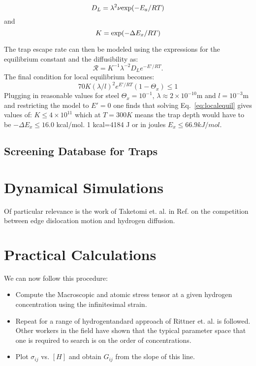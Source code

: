 \documentclass{article}
\begin{document}
\begin{equation}
D_{L} = \lambda^{2}\nu {\rm exp}(-E_{a}/RT)
\end{equation}
and
\begin{equation}
K = {\rm exp}(-\Delta E_{x}/RT)
\end{equation}

The trap escape rate can then be modeled using the expressions for the
equilibrium constant and the diffusibility as:
\begin{equation}
\mathcal{R} = K^{-1}\lambda^{-2}D_{L}e^{-E'/RT}.
\end{equation}
The final condition for local equilibrium becomes:
%
\begin{equation}
\label{eq:localequil}
70K(\lambda/l)^{2}e^{E'/RT}(1-\Theta_{x}) \le 1
\end{equation}
%
Plugging in reasonable values for steel $\Theta_{x}=10^{-1}$,
$\lambda \approx 2\times 10^{-10}$m and $l=10^{-3}$m and restricting the 
model to $E'=0$ one finds that solving Eq.~\ref{eq:localequil} gives
values of: $K\le 4 \times 10^{11}$ which at $T=300K$ means the trap depth
would have to be $-\Delta E_{x} \le 16.0$ kcal/mol. 1 kcal=4184 J or 
in joules $E_{x} \le 66.9 kJ/mol$.

\subsection{Screening Database for Traps}

\section{Dynamical Simulations}
Of particular relevance is the work of Taketomi et. al. in Ref.\cite{taketomi11} on the competition
between edge dislocation motion and hydrogen diffusion. 

\section{Practical Calculations}
We can now follow this procedure: 
\begin{itemize}
\item Compute the Macroscopic and atomic stress tensor at a 
given hydrogen concentration using the infinitesimal strain.
\item Repeat for a range of hydrogentandard approach of Rittner et. al. is followed. 
Other workers in the field have shown that the typical parameter 
space that one is required to search is on the order of %
concentrations.
\item Plot $\sigma_{ij}$ vs. $[H]$ and obtain $G_{ij}$ from the slope of this line.
\end{itemize}
\end{document}
